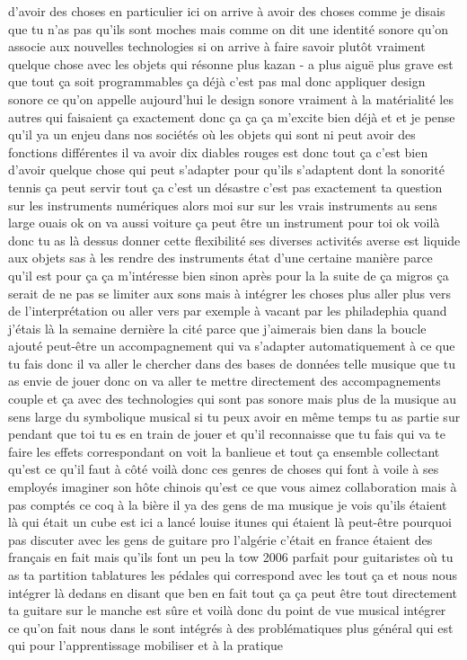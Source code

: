  d'avoir des choses en particulier ici on arrive à avoir des choses comme je disais que tu n'as pas qu'ils sont moches mais comme on dit une identité sonore qu'on associe aux nouvelles technologies si on arrive à faire savoir plutôt vraiment quelque chose avec les objets qui résonne plus kazan - a plus aiguë plus grave est que tout ça soit programmables ça déjà c'est pas mal donc appliquer design sonore ce qu'on appelle aujourd'hui le design sonore vraiment à la matérialité les autres qui faisaient ça exactement donc ça ça ça m'excite bien déjà et et je pense qu'il ya un enjeu dans nos sociétés où les objets qui sont ni peut avoir des fonctions différentes il va avoir dix diables rouges est donc tout ça c'est bien d'avoir quelque chose qui peut s'adapter pour qu'ils s'adaptent dont la sonorité tennis ça peut servir tout ça c'est un désastre c'est pas exactement ta question sur les instruments numériques alors moi sur sur les vrais instruments au sens large ouais ok on va aussi voiture ça peut être un instrument pour toi ok voilà donc tu as là dessus donner cette flexibilité ses diverses activités averse est liquide aux objets sas à les rendre des instruments état d'une certaine manière parce qu'il est pour ça ça m'intéresse bien sinon après pour la la suite de ça migros ça serait de ne pas se limiter aux sons mais à intégrer les choses plus aller plus vers de l'interprétation ou aller vers par exemple à vacant par les philadephia quand j'étais là la semaine dernière la cité parce que j'aimerais bien dans la boucle ajouté peut-être un accompagnement qui va s'adapter automatiquement à ce que tu fais donc il va aller le chercher dans des bases de données telle musique que tu as envie de jouer donc on va aller te mettre directement des accompagnements couple et ça avec des technologies qui sont pas sonore mais plus de la musique au sens large du symbolique musical si tu peux avoir en même temps tu as partie sur pendant que toi tu es en train de jouer et qu'il reconnaisse que tu fais qui va te faire les effets correspondant on voit la banlieue et tout ça ensemble collectant qu'est ce qu'il faut à côté voilà donc ces genres de choses qui font à voile à ses employés imaginer son hôte chinois qu'est ce que vous aimez collaboration mais à pas comptés ce coq à la bière il ya des gens de ma musique je vois qu'ils étaient là qui était un cube est ici a lancé louise itunes qui étaient là peut-être pourquoi pas discuter avec les gens de guitare pro l'algérie c'était en france étaient des français en fait mais qu'ils font un peu la tow 2006 parfait pour guitaristes où tu as ta partition tablatures les pédales qui correspond avec les tout ça et nous nous intégrer là dedans en disant que ben en fait tout ça ça peut être tout directement ta guitare sur le manche est sûre et voilà donc du point de vue musical intégrer ce qu'on fait nous dans le sont intégrés à des problématiques plus général qui est qui pour l'apprentissage mobiliser et à la pratique 
